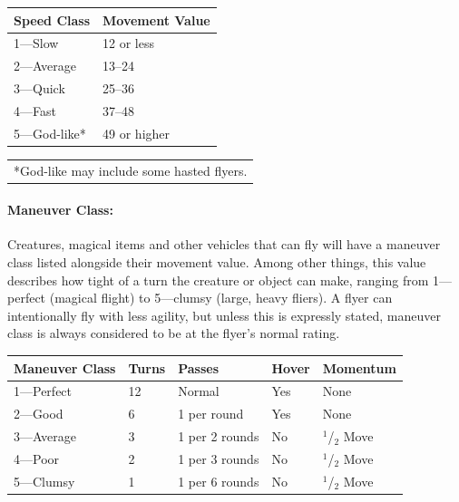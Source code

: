\begin{multicols}{2}
\noindent
\begin{minipage}{\columnwidth}

\label{speedclasses}
\noindent
\begin{tabular}{|p{}|p{}|}
\hline
Speed Class		& Movement Value \\
\hline\hline
\rowcolor[gray]{.9}1---Slow		& 12 or less \\
2---Average		& 13--24 \\
\rowcolor[gray]{.9}3---Quick		& 25--36 \\
4---Fast		& 37--48 \\
\rowcolor[gray]{.9}5---God-like*	& 49 or higher \\
\hline
\end{tabular}
\noindent\begin{tabular}{p{}}
*God-like may include some hasted flyers. \\
\end{tabular}\vspace{.5em}

\end{minipage}

\paragraph{Maneuver Class:} Creatures, magical items and other vehicles that can fly will have a maneuver class listed alongside their movement value. Among other things, this value describes how tight of a turn the creature or object can make, ranging from 1---perfect (magical flight) to 5---clumsy (large, heavy fliers).   A flyer can intentionally fly with less agility, but unless this is expressly stated, maneuver class is always considered to be at the flyer's normal rating.

\noindent
\begin{minipage}{\columnwidth}

\label{maneuverclasses}
\noindent
\begin{tabular}{|p{}|p{}|p{}|p{}|p{}|}
\hline
Maneuver Class 	& Turns	& Passes			& Hover & Momen\-tum \\
\hline\hline
\rowcolor[gray]{.9}1---Perfect		& 12	& Normal			& Yes 	& None \\
2---Good		& 6		& 1 per round		& Yes		& None \\
\rowcolor[gray]{.9}3---Average		& 3		& 1 per 2 rounds	& No		& $^1$/$_2$ Move \\
4---Poor		& 2		& 1 per 3 rounds	& No	& $^1$/$_2$ Move \\
\rowcolor[gray]{.9}5---Clumsy		& 1		& 1 per 6 rounds	& No		& $^1$/$_2$ Move \\
\hline
\end{tabular}


\end{minipage}
\end{multicols}
